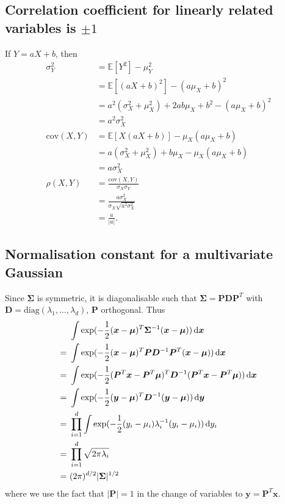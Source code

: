 \subsection{Correlation coefficient for linearly related variables is $\pm1$}
If $Y=aX+b$, then
\begin{align*}
\sigma_Y^2 &= \mathbb{E}[Y^2] - \mu_Y^2\\
&= \mathbb{E}[(aX+b)^2] - (a\mu_X+b)^2\\
&= a^2(\sigma_X^2+\mu_X^2) + 2ab\mu_X + b^2 - (a\mu_X+b)^2\\
&= a^2\sigma_X^2\\
\mathrm{cov}(X,Y) &= \mathbb{E}[X(aX+b)] - \mu_X(a\mu_X+b)\\
&= a(\sigma_X^2+\mu_X^2) + b\mu_X - \mu_X(a\mu_X+b)\\
&= a\sigma_X^2\\
\rho(X,Y) &= \frac{\mathrm{cov}(X,Y)}{\sigma_X\sigma_Y}\\
&= \frac{a\sigma_X^2}{\sigma_X\sqrt{a^2\sigma_X^2}}\\
&= \frac{a}{|a|}.
\end{align*}

\subsection{Normalisation constant for a multivariate Gaussian}
Since $\bm{\Sigma}$ is symmetric, it is diagonalisable such that $\bm{\Sigma} = \bm{P}\bm{D}\bm{P}^T$ with $\bm{D} = \mathrm{diag}(\lambda_1,\dots,\lambda_d)$, $\bm{P}$ orthogonal. Thus
\begin{align*}
&\int \exp(-\frac{1}{2} (\bm{x}-\bm{\mu})^T \bm{\Sigma}^{-1} (\bm{x}-\bm{\mu})) \mathop{}\!\mathrm{d}\bm{x}\\
=\ &\int \exp(-\frac{1}{2} (\bm{x}-\bm{\mu})^T \bm{P}\bm{D}^{-1}\bm{P}^T (\bm{x}-\bm{\mu})) \mathop{}\!\mathrm{d}\bm{x}\\
=\ &\int \exp(-\frac{1}{2} (\bm{P}^T\bm{x}-\bm{P}^T\bm{\mu})^T \bm{D}^{-1} (\bm{P}^T\bm{x}-\bm{P}^T\bm{\mu})) \mathop{}\!\mathrm{d}\bm{x}\\
=\ &\int \exp(-\frac{1}{2} (\bm{y}-\bm{\mu})^T \bm{D}^{-1} (\bm{y}-\bm{\mu})) \mathop{}\!\mathrm{d}\bm{y}\\
=\ &\prod_{i=1}^{d} \int \exp(-\frac{1}{2} (y_i-\mu_i)\lambda_i^{-1}(y_i-\mu_i)) \mathop{}\!\mathrm{d} y_i\\
=\ &\prod_{i=1}^{d} \sqrt{2\pi\lambda_i}\\
=\ &(2\pi)^{d/2}|\bm\Sigma|^{1/2}
\end{align*}
where we use the fact that $|\bm{P}| = 1$ in the change of variables to $\bm{y} = \bm{P}^T\bm{x}$.

